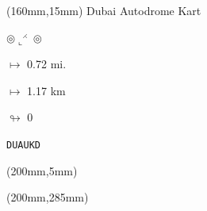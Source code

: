 \begin{textblock*}{40mm}(160mm,15mm)%
Dubai Autodrome Kart
\par $\circledcirc\llcorner^{\rightthreetimes}\circledcirc$
\Large
\par$\mapsto$ 0.72 mi.
\par$\mapsto$ 1.17 km
\par$\looparrowright$ 0
\par\hfill\tiny\tt DUAUKD\\
\end{textblock*}
\begin{textblock*}{20mm}(200mm,5mm)%
\fbox{\thepage}
\end{textblock*}
\begin{textblock*}{20mm}(200mm,285mm)%
\fbox{\thepage}
\end{textblock*}
\null\newpage

